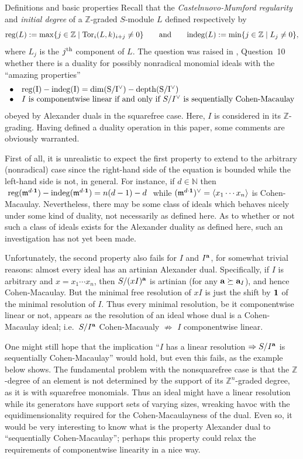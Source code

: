 \documentclass[12pt,leqno]{article}
\def\<{{\langle}}
\def\>{{\rangle}}
\def\aa{{{\rm \bf a}}}
\def\mm{{\mathfrak m}}
\def\NN{{\mathbb N}}
\def\ZZ{{\mathbb Z}}
\begin{document}
\begin{section}{Definitions and basic properties}
Recall that the {\it Castelnuovo-Mumford regularity} and {\it initial
degree} of a $\ZZ$-graded $S$-module $L$ defined respectively by
$$
  {\rm reg}(L) := \max\{j \in \ZZ \mid {\rm Tor}_i(L,k)_{i + j} \neq 0\}
  \qquad {\rm and} \qquad
  {\rm indeg}(L) := \min\{j \in \ZZ \mid L_j \neq 0\},
$$
where $L_j$ is the $j^{\rm th}$ component of $L$.  The question was
raised in \cite{HRW}, Question~10 whether there is a duality for possibly
nonradical monomial ideals with the ``amazing properties''
$$
\begin{array}{rl}
\bullet &
	\rm{reg}(I) - \rm{indeg}(I) = \dim (S/I^\vee) -
	\rm{depth}(S/I^\vee)
\cr
\bullet &
	I \hbox{ is componentwise linear if and only if } S/I^\vee
	\hbox{ is sequentially Cohen-Macaulay}
\end{array}
$$
obeyed by Alexander duals in the squarefree case.  Here, $I$ is
considered in its $\ZZ$-grading.  Having defined a duality operation in
this paper, some comments are obviously warranted.

First of all, it is unrealistic to expect the first property to extend to
the arbitrary (nonradical) case since the right-hand side of the equation
is bounded while the left-hand side is not, in general.  For instance, if
$d \in \NN$ then $\ {\rm reg}(\mm^{d \cdot {\bf 1}}) - {\rm indeg}(\mm^{d
\cdot {\bf 1}}) = n(d-1) - d\ $ while $(\mm^{d \cdot {\bf 1}})^\vee =
\<x_1 \cdots x_n\>$ is Cohen-Macaulay.  Nevertheless, there may be some
class of ideals which behaves nicely under some kind of duality, not
necessarily as defined here.  As to whether or not such a class of ideals
exists for the Alexander duality as defined here, such an investigation
has not yet been made.

Unfortunately, the second property also fails for $I$ and $I^\aa$, for
somewhat trivial reasons: almost every ideal has an artinian Alexander
dual.  Specifically, if $I$ is arbitrary and $x = x_1 \cdots x_n$, then
$S/(xI)^\aa$ is artinian (for any $\aa \succeq \aa_I$), and hence
Cohen-Macaulay.  But the minimal free resolution of $xI$ is just the
shift by ${\bf 1}$ of the minimal resolution of $I$.  Thus every minimal
resolution, be it componentwise linear or not, appears as the resolution
of an ideal whose dual is a Cohen-Macaulay ideal; i.e.\ $S/I^\aa$
Cohen-Macaualy $\not \Rightarrow$ $I$ componentwise linear.

One might still hope that the implication ``$I$ has a linear resolution
$\Rightarrow S/I^\aa$ is sequentially Cohen-Macaulay'' would hold, but
even this fails, as the example below shows.  The fundamental problem
with the nonsquarefree case is that the $\ZZ$-degree of an element is not
determined by the support of its $\ZZ^n$-graded degree, as it is with
squarefree monomials.  Thus an ideal might have a linear resolution while
its generators have support sets of varying sizes, wreaking havoc with
the equidimensionality required for the Cohen-Macaulayness of the dual.
Even so, it would be very interesting to know what is the property
Alexander dual to ``sequentially Cohen-Macaulay''; perhaps this property
could relax the requirements of componentwise linearity in a nice way.


\end{section}
\end{document}
